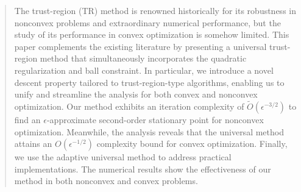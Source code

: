 

\date{Received: date / Accepted: date}


\maketitle

\begin{abstract}
The trust-region (TR) method is renowned historically for 
its robustness in nonconvex problems and extraordinary numerical performance, but the study of its performance in convex optimization is somehow limited.
This paper complements the existing literature by
presenting a universal trust-region method that simultaneously incorporates the quadratic regularization and ball constraint. In particular, we introduce a novel descent property tailored to trust-region-type algorithms, enabling us to unify and streamline the analysis for both convex and nonconvex optimization. Our method exhibits an iteration complexity of $\tilde O(\epsilon^{-3/2})$ to find an $\epsilon$-approximate second-order stationary point for nonconvex optimization. Meanwhile, the analysis reveals that the universal method attains an $O(\epsilon^{-1/2})$ complexity bound for convex optimization. 
Finally, we use the adaptive universal method to address practical implementations. The numerical results show the effectiveness of our method in both nonconvex and convex problems.
\end{abstract}

